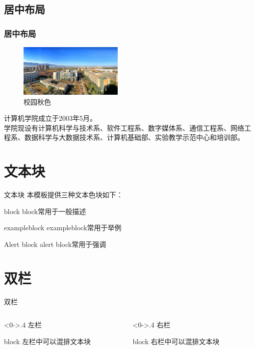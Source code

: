 \documentclass[10pt,aspectratio=43,mathserif,table]{beamer}
\begin{document}
\subsection{居中布局}
\begin{frame}
	\frametitle{居中布局}
	\begin{figure}[!t]
		\centering
		\includegraphics[width=2in]{figures/XSYU-autumn.jpg}
		\caption{校园秋色}
		\label{figure_autumn}
	\end{figure}
	\begin{center}
		计算机学院成立于2003年5月。\\
		学院现设有计算机科学与技术系、软件工程系、数字媒体系、通信工程系、网络工程系、数据科学与大数据技术系、计算机基础部、实验教学示范中心和培训部。
	\end{center}
	\end{frame}
\section{文本块}
\begin{frame}{文本块}
本模板提供三种文本色块如下：
\begin{block}{block}
		block常用于一般描述
	\end{block}
\begin{exampleblock}{exampleblock}
	exampleblock常用于举例
\end{exampleblock}
\begin{alertblock}{Alert block}
	alert block常用于强调
\end{alertblock}
\end{frame}

\section{双栏}
\begin{frame}{双栏}
\begin{columns}[c] %
	\begin{column}<0->{.4\textwidth}
		左栏
		\begin{block}{block}
			左栏中可以混排文本块
		\end{block}
    \end{column}%
\hfill%
	\begin{column}<0->{.4\textwidth}
		右栏
		\begin{block}{block}
			右栏中可以混排文本块
		\end{block}
    \end{column}%
\end{columns}
\end{frame}
\end{document}

